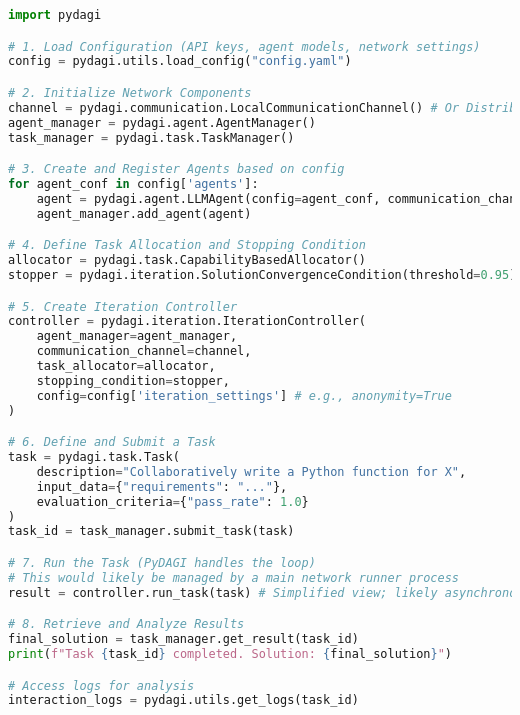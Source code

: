 \documentclass[12pt]{amsart}
\begin{document}
\begin{lstlisting}[language=Python, caption={Conceptual PyDAGI Usage Example}, label={lst:pydagi_example}]
import pydagi

# 1. Load Configuration (API keys, agent models, network settings)
config = pydagi.utils.load_config("config.yaml")

# 2. Initialize Network Components
channel = pydagi.communication.LocalCommunicationChannel() # Or Distributed
agent_manager = pydagi.agent.AgentManager()
task_manager = pydagi.task.TaskManager()

# 3. Create and Register Agents based on config
for agent_conf in config['agents']:
    agent = pydagi.agent.LLMAgent(config=agent_conf, communication_channel=channel)
    agent_manager.add_agent(agent)

# 4. Define Task Allocation and Stopping Condition
allocator = pydagi.task.CapabilityBasedAllocator()
stopper = pydagi.iteration.SolutionConvergenceCondition(threshold=0.95)

# 5. Create Iteration Controller
controller = pydagi.iteration.IterationController(
    agent_manager=agent_manager,
    communication_channel=channel,
    task_allocator=allocator,
    stopping_condition=stopper,
    config=config['iteration_settings'] # e.g., anonymity=True
)

# 6. Define and Submit a Task
task = pydagi.task.Task(
    description="Collaboratively write a Python function for X",
    input_data={"requirements": "..."},
    evaluation_criteria={"pass_rate": 1.0}
)
task_id = task_manager.submit_task(task)

# 7. Run the Task (PyDAGI handles the loop)
# This would likely be managed by a main network runner process
result = controller.run_task(task) # Simplified view; likely asynchronous

# 8. Retrieve and Analyze Results
final_solution = task_manager.get_result(task_id)
print(f"Task {task_id} completed. Solution: {final_solution}")

# Access logs for analysis
interaction_logs = pydagi.utils.get_logs(task_id)
\end{lstlisting}
\end{document}
